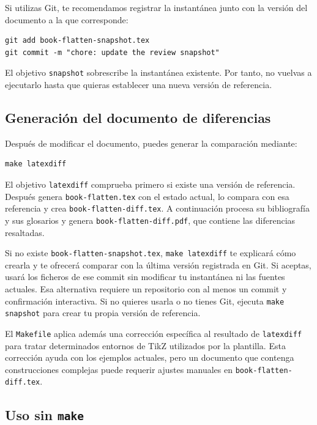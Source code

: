 Si utilizas Git, te recomendamos registrar la instantánea junto con la versión del documento a la que corresponde:

\begin{verbatim}
git add book-flatten-snapshot.tex
git commit -m "chore: update the review snapshot"
\end{verbatim}

El objetivo \texttt{snapshot} sobrescribe la instantánea existente. Por tanto, no vuelvas a ejecutarlo hasta que quieras establecer una nueva versión de referencia.

\subsection{Generación del documento de diferencias}

Después de modificar el documento, puedes generar la comparación mediante:

\begin{verbatim}
make latexdiff
\end{verbatim}

El objetivo \texttt{latexdiff} comprueba primero si existe una versión de referencia. Después genera \texttt{book-flatten.tex} con el estado actual, lo compara con esa referencia y crea \texttt{book-flatten-diff.tex}. A continuación procesa su bibliografía y sus glosarios y genera \texttt{book-flatten-diff.pdf}, que contiene las diferencias resaltadas.

Si no existe \texttt{book-flatten-snapshot.tex}, \texttt{make latexdiff} te explicará cómo crearla y te ofrecerá comparar con la última versión registrada en Git. Si aceptas, usará los ficheros de ese commit sin modificar tu instantánea ni las fuentes actuales. Esa alternativa requiere un repositorio con al menos un commit y confirmación interactiva. Si no quieres usarla o no tienes Git, ejecuta \texttt{make snapshot} para crear tu propia versión de referencia.

El \texttt{Makefile} aplica además una corrección específica al resultado de \texttt{latexdiff} para tratar determinados entornos de TikZ utilizados por la plantilla. Esta corrección ayuda con los ejemplos actuales, pero un documento que contenga construcciones complejas puede requerir ajustes manuales en \texttt{book-flatten-diff.tex}.

\subsection{Uso sin \texttt{make}}

